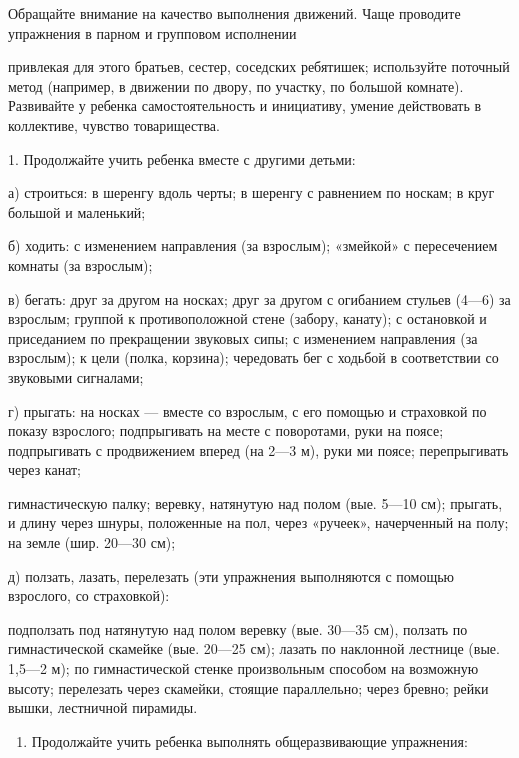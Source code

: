 \documentclass{book}
\begin{document}
Обращайте внимание на качество выполнения движений. Чаще проводите
упражнения в парном и групповом исполнении

привлекая для этого братьев, сестер, соседских ребятишек; используйте
поточный метод (например, в движении по двору, по участку, по большой
комнате). Развивайте у ребенка самостоятельность и инициативу, умение
действовать в коллективе, чувство товарищества.

1. Продолжайте учить ребенка вместе с другими детьми:

а) строиться: в шеренгу вдоль черты; в шеренгу с равнением по носкам; в
круг большой и маленький;

б) ходить: с изменением направления (за взрослым); «змейкой» с
пересечением комнаты (за взрослым);

в) бегать: друг за другом на носках; друг за другом с огибанием стульев
(4---6) за взрослым; группой к противоположной стене (забору, канату); с
остановкой и приседанием по прекращении звуковых сипы; с изменением
направления (за взрослым); к цели (полка, корзина); чередовать бег с
ходьбой в соответствии со звуковыми сигналами;

г) прыгать: на носках --- вместе со взрослым, с его помощью и страховкой
по показу взрослого; подпрыгивать на месте с поворотами, руки на поясе;
подпрыгивать с продвижением вперед (на 2---3 м), руки ми поясе;
перепрыгивать через канат;

гимнастическую палку; веревку, натянутую над полом (вые. 5---10 см);
прыгать, и длину через шнуры, положенные на пол, через «ручеек»,
начерченный на полу; на земле (шир. 20---30 см);

д) ползать, лазать, перелезать (эти упражнения выполняются с помощью
взрослого, со страховкой):

подползать под натянутую над полом веревку (вые. 30---35 см), ползать по
гимнастической скамейке (вые. 20---25 см); лазать по наклонной лестнице
(вые. 1,5---2 м); по гимнастической стенке произвольным способом на
возможную высоту; перелезать через скамейки, стоящие параллельно; через
бревно; рейки вышки, лестничной пирамиды.


\begin{enumerate}
\def\labelenumi{\arabic{enumi}.}
\setcounter{enumi}{2}
\item
  
  Продолжайте учить ребенка выполнять общеразвивающие упражнения:
  
\end{enumerate}
\end{document}
